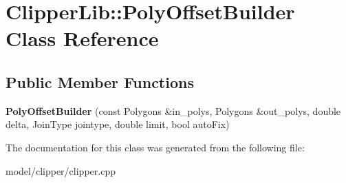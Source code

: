 \hypertarget{classClipperLib_1_1PolyOffsetBuilder}{\section{Clipper\-Lib\-:\-:Poly\-Offset\-Builder Class Reference}
\label{classClipperLib_1_1PolyOffsetBuilder}
}
\subsection*{Public Member Functions}
\begin{DoxyCompactItemize}
\item 
\hypertarget{classClipperLib_1_1PolyOffsetBuilder_a5b0a249738e8093fa176d4ca2da1b1d9}{{\bfseries Poly\-Offset\-Builder} (const Polygons \&in\-\_\-polys, Polygons \&out\-\_\-polys, double delta, Join\-Type jointype, double limit, bool auto\-Fix)}\label{classClipperLib_1_1PolyOffsetBuilder_a5b0a249738e8093fa176d4ca2da1b1d9}

\end{DoxyCompactItemize}


The documentation for this class was generated from the following file\-:\begin{DoxyCompactItemize}
\item 
model/clipper/clipper.\-cpp\end{DoxyCompactItemize}

